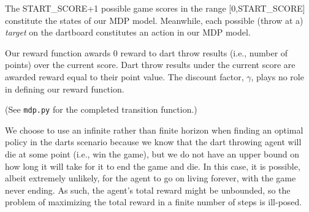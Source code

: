 \documentclass[solution, letterpaper]{cs121}
\begin{document}

\subproblem{} %
The \textsc{START\_SCORE}+1 possible game scores in the range [0,\textsc{START\_SCORE}] constitute the states of our MDP model. Meanwhile, each possible (throw at a) \emph{target} on the dartboard constitutes an action in our MDP model.

\subproblem{} %
Our reward function awards 0 reward to dart throw results (i.e., number of points) over the current score. Dart throw results under the current score are awarded reward equal to their point value. The discount factor, $\gamma$, plays no role in defining our reward function.

\subproblem{} %
(See {\tt mdp.py} for the completed transition function.)

\subproblem{} %
We choose to use an infinite rather than finite horizon when finding an optimal policy in the darts scenario because we know that the dart throwing agent will die at some point (i.e., win the game), but we do not have an upper bound on how long it will take for it to end the game and die. In this case, it is possible, albeit extremely unlikely, for the agent to go on living forever, with the game never ending. As such, the agent's total reward might be unbounded, so the problem of maximizing the total reward in a finite number of steps is ill-posed.

\subproblem{} %


\subproblem{} %






\end{document}

